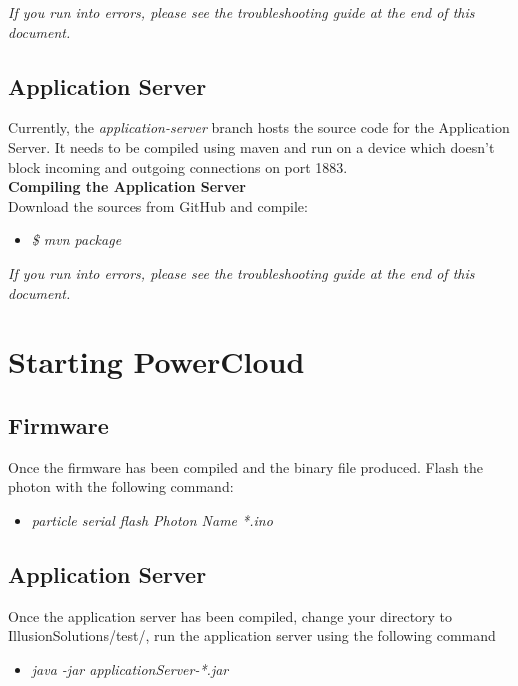 \documentclass[a4paper,10pt]{article}
\begin{document}
	\textit{If you run into errors, please see the troubleshooting guide at the end of this document.}
	
	\subsection{Application Server}
	Currently, the \textit{application-server} branch hosts the source code for 
	the Application Server. It needs to be compiled using maven and run on a 
	device which doesn't block incoming and outgoing connections on port 1883.\\
	
	\textbf{Compiling the Application Server}\\
	Download the sources from GitHub and compile:\\
	
	\begin{itemize}
		\item \textit{\$ mvn package}
	\end{itemize}		
	
	\textit{If you run into errors, please see the troubleshooting guide at the end of this document.}
	
	\newpage
	\section{Starting PowerCloud}
	\subsection{Firmware}
	Once the firmware has been compiled and the binary file produced. Flash the photon with the following command:
	
	\begin{itemize}
		\item \textit{particle serial flash Photon Name *.ino}
	\end{itemize}
	
	\subsection{Application Server}
	Once the application server has been compiled, change your directory to IllusionSolutions/test/, run the application server using the following command
	
	\begin{itemize}
		\item \textit{java -jar applicationServer-*.jar}
	\end{itemize}
	
\end{document}
